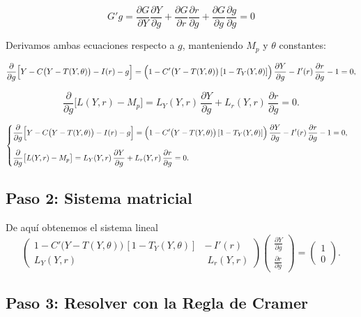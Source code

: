 \documentclass{article}
\begin{document}
\begin{equation*}
G'g= \dfrac{\partial G}{\partial Y} \dfrac{\partial Y}{\partial g} +\dfrac{\partial G}{\partial r} \dfrac{\partial r}{\partial g} + \dfrac{\partial G}{\partial g} \dfrac{\partial g}{\partial g} =0
\end{equation*}


Derivamos ambas ecuaciones respecto a \(g\), manteniendo \(M_p\) y \(\theta\) constantes:

\[
\frac{\partial}{\partial g}\Bigl[Y - C\bigl(Y - T(Y,\theta)\bigr) - I(r) - g\Bigr]
= \Bigl(1 - C'\bigl(Y - T(Y,\theta)\bigr)\,[1 - T_Y(Y,\theta)]\Bigr)\,\frac{\partial Y}{\partial g}
- I'(r)\,\frac{\partial r}{\partial g}
- 1
= 0,
\]

\[
\frac{\partial}{\partial g}\bigl[L(Y,r) - M_p\bigr]
= L_Y(Y,r)\,\frac{\partial Y}{\partial g}
+ L_r(Y,r)\,\frac{\partial r}{\partial g}
= 0.
\]


\[
\begin{cases}
\displaystyle
\frac{\partial}{\partial g}\Bigl[Y - C\bigl(Y - T(Y,\theta)\bigr) - I(r) - g\Bigr]
= \Bigl(1 - C'\bigl(Y - T(Y,\theta)\bigr)\,[1 - T_Y(Y,\theta)]\Bigr)\,\dfrac{\partial Y}{\partial g}
- I'(r)\,\dfrac{\partial r}{\partial g}
- 1
= 0,\\[1.5em]
\displaystyle
\frac{\partial}{\partial g}\bigl[L(Y,r) - M_p\bigr]
= L_Y(Y,r)\,\dfrac{\partial Y}{\partial g}
+ L_r(Y,r)\,\dfrac{\partial r}{\partial g}
= 0.
\end{cases}
\]

\subsection*{Paso 2: Sistema matricial}
De aquí obtenemos el sistema lineal
\[
\begin{pmatrix}
1 - C'\bigl(Y - T(Y,\theta)\bigr)\,[1 - T_Y(Y,\theta)] & -\,I'(r) \\[6pt]
L_Y(Y,r)                                              & \;L_r(Y,r)
\end{pmatrix}
\begin{pmatrix}
\displaystyle \frac{\partial Y}{\partial g} \\[4pt]
\displaystyle \frac{\partial r}{\partial g}
\end{pmatrix}
=
\begin{pmatrix}
1 \\[4pt]
0
\end{pmatrix}.
\]

\subsection*{Paso 3: Resolver con la Regla de Cramer}
\end{document}
